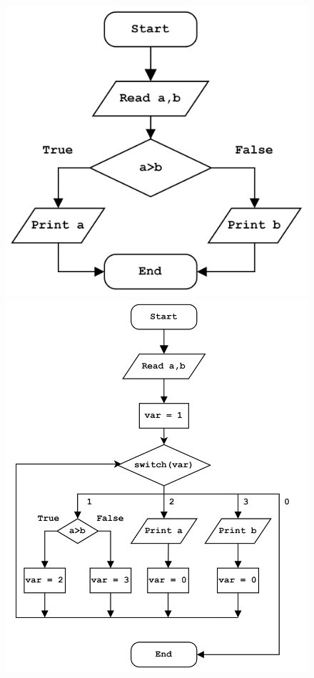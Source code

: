 \documentclass[
  digital, %
  notable,   %
  twoside, %
  nolof,     %
  nolot,     %
]{fithesis3}
\theoremstyle{definition}
\begin{document}
\begin{figure}
    \begin{center}
        \begin{minipage}{.39\textwidth}
             \includegraphics[width=\textwidth]{notflat.png}
        \end{minipage}
        \begin{minipage}{.6\textwidth}
             \includegraphics[width=\textwidth]{flat.png}

\end{minipage}
\end{center}
\end{figure}
\end{document}
